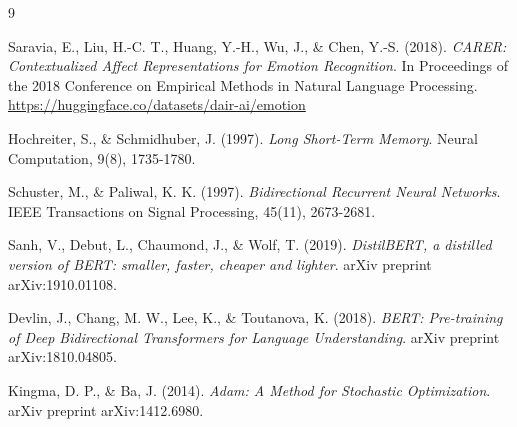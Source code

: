 \documentclass[12pt,a4paper]{article}
\begin{document}

\begin{thebibliography}{9}

Saravia, E., Liu, H.-C. T., Huang, Y.-H., Wu, J., \& Chen, Y.-S. (2018).
\textit{CARER: Contextualized Affect Representations for Emotion Recognition}.
In Proceedings of the 2018 Conference on Empirical Methods in Natural Language Processing.
\url{https://huggingface.co/datasets/dair-ai/emotion}

Hochreiter, S., \& Schmidhuber, J. (1997).
\textit{Long Short-Term Memory}.
Neural Computation, 9(8), 1735-1780.

Schuster, M., \& Paliwal, K. K. (1997).
\textit{Bidirectional Recurrent Neural Networks}.
IEEE Transactions on Signal Processing, 45(11), 2673-2681.

Sanh, V., Debut, L., Chaumond, J., \& Wolf, T. (2019).
\textit{DistilBERT, a distilled version of BERT: smaller, faster, cheaper and lighter}.
arXiv preprint arXiv:1910.01108.

Devlin, J., Chang, M. W., Lee, K., \& Toutanova, K. (2018).
\textit{BERT: Pre-training of Deep Bidirectional Transformers for Language Understanding}.
arXiv preprint arXiv:1810.04805.

Kingma, D. P., \& Ba, J. (2014).
\textit{Adam: A Method for Stochastic Optimization}.
arXiv preprint arXiv:1412.6980.

\end{thebibliography}
\end{document}
